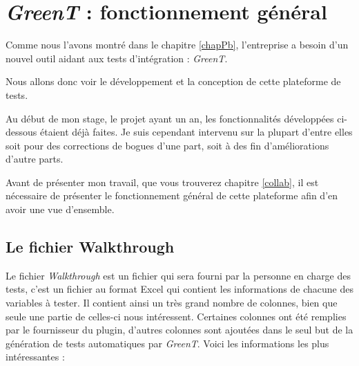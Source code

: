 \chapter{\textit{GreenT} : fonctionnement général}\label{chapGreent}
\putminitoc

Comme nous l'avons montré dans le chapitre \ref{chapPb}, l'entreprise a besoin d'un nouvel outil aidant aux tests d'intégration : \textit{GreenT}. 

Nous allons donc voir le développement et la conception de cette plateforme de tests.

Au début de mon stage, le projet ayant un an, les fonctionnalités développées ci-dessous étaient déjà faites. Je suis cependant intervenu
sur la plupart d'entre elles soit pour des corrections de bogues d'une part, soit à des fin d'améliorations d'autre parts.

Avant de présenter mon travail, que vous trouverez chapitre \ref{collab}, il est nécessaire de présenter le fonctionnement général de
cette plateforme afin d'en avoir une vue d'ensemble.

\section{Le fichier Walkthrough}\label{wt}
Le fichier \textit{Walkthrough} est un fichier qui sera fourni par la personne en charge des tests, c'est un fichier au format Excel qui contient les informations
de chacune des variables à tester. Il contient ainsi un très grand nombre de colonnes, bien que seule une partie de celles-ci nous
intéressent. Certaines colonnes ont été remplies par le fournisseur du plugin, d'autres colonnes sont ajoutées dans le seul but de la
génération de tests automatiques par \textit{GreenT}. Voici les informations les plus intéressantes : 

